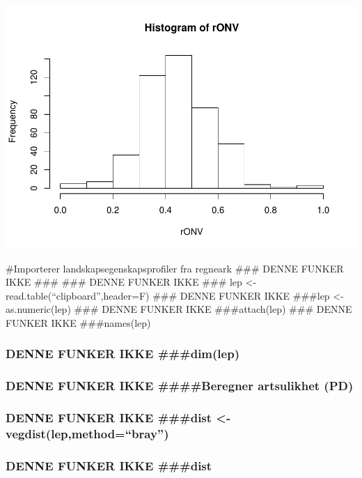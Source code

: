 \documentclass[]{article}
\begin{document}
\includegraphics{Landscape_analysis_example_4_files/figure-latex/unnamed-chunk-39-1.pdf}

\#Importerer landskapsegenskapsprofiler fra regneark \#\#\# DENNE FUNKER
IKKE \#\#\# \#\#\# DENNE FUNKER IKKE \#\#\# lep \textless{}-
read.table(``clipboard'',header=F) \#\#\# DENNE FUNKER IKKE \#\#\#lep
\textless{}- as.numeric(lep) \#\#\# DENNE FUNKER IKKE \#\#\#attach(lep)
\#\#\# DENNE FUNKER IKKE \#\#\#names(lep)

\hypertarget{denne-funker-ikke-dimlep-1}{%
\subsubsection{DENNE FUNKER IKKE
\#\#\#dim(lep)}\label{denne-funker-ikke-dimlep-1}}

\hypertarget{denne-funker-ikke-beregner-artsulikhet-pd}{%
\subsubsection{DENNE FUNKER IKKE \#\#\#\#Beregner artsulikhet
(PD)}\label{denne-funker-ikke-beregner-artsulikhet-pd}}

\hypertarget{denne-funker-ikke-dist---vegdistlepmethodbray-1}{%
\subsubsection{DENNE FUNKER IKKE \#\#\#dist \textless{}-
vegdist(lep,method=``bray'')}\label{denne-funker-ikke-dist---vegdistlepmethodbray-1}}

\hypertarget{denne-funker-ikke-dist-1}{%
\subsubsection{DENNE FUNKER IKKE
\#\#\#dist}\label{denne-funker-ikke-dist-1}}
\end{document}
